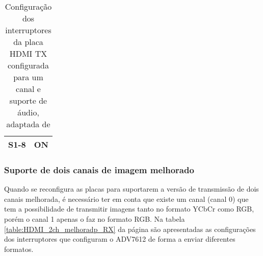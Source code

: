 \begin{table}[h!]
\begin{tabular}{|c|c|c|c|c|c|c|c|c|c|}
		\textbf{S1-8}                    & \multicolumn{9}{c|}{ON}                                                                                                                                                                                                                                                                                                                                                    \\ \hline
	\end{tabular}
	\caption{Configuração dos interruptores da placa HDMI TX configurada para um canal e suporte de áudio, adaptada de \cite{R014}}
	\label{table:HDMI_1ch+audio_switches_TX}
\end{table}

\subsubsection{Suporte de dois canais de imagem melhorado} \label{subsubsec:HDMIconfigMelhorado_switches}

Quando se reconfigura as placas para suportarem a versão de transmissão de dois canais melhorada, é necessário ter em conta que existe um canal (canal 0) que tem a possibilidade de transmitir imagens tanto no formato YCbCr como RGB, porém o canal 1 apenas o faz no formato RGB. Na tabela \ref{table:HDMI_2ch_melhoradp_RX} da página \pageref{table:HDMI_2ch_melhoradp_RX} são apresentadas as configurações dos interruptores que configuram o ADV7612 de forma a enviar diferentes formatos.

